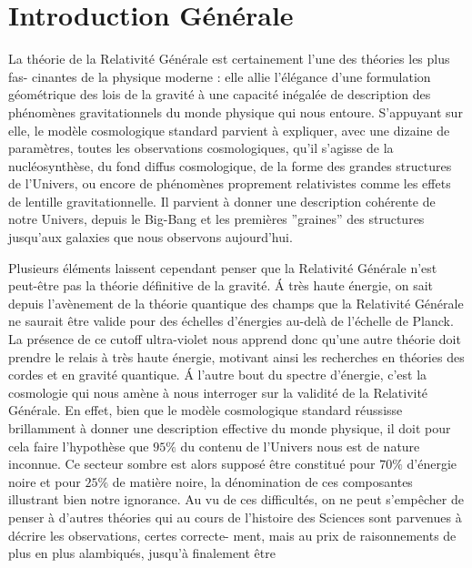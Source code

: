 \documentclass[a4paper,12pt]{report}
\theoremstyle{plain}
\theoremstyle{plain}
\begin{document}
\chapter{Introduction G\'en\'erale} \label{introduction}
 \minitoc 
La th\'eorie de la Relativit\'e G\'en\'erale est certainement l'une des th\'eories les plus fas-
cinantes de la physique moderne : elle allie l'\'el\'egance d'une formulation g\'eom\'etrique des
lois de la gravit\'e \`a une capacit\'e in\'egal\'ee de description des ph\'enom\`enes gravitationnels du
monde physique qui nous entoure. S'appuyant sur elle, le mod\`ele cosmologique standard
parvient \`a expliquer, avec une dizaine de param\`etres, toutes les observations cosmologiques,
qu'il s'agisse de la nucl\'eosynth\`ese, du fond diffus cosmologique, de la forme des grandes
structures de l'Univers, ou encore de ph\'enom\`enes proprement relativistes comme les effets
de lentille gravitationnelle. Il parvient \`a donner une description coh\'erente de notre Univers,
depuis le Big-Bang et les premi\`eres ''graines'' des structures jusqu'aux galaxies que nous
observons aujourd'hui.\par
Plusieurs \'el\'ements laissent cependant penser que la Relativit\'e G\'en\'erale n'est peut-\^etre
pas la th\'eorie d\'efinitive de la gravit\'e. \'A tr\`es haute \'energie, on sait depuis l'av\`enement de
la th\'eorie quantique des champs que la Relativit\'e G\'en\'erale ne saurait \^etre valide pour des
\'echelles d'\'energies au-del\`a de l'\'echelle de Planck. La pr\'esence de ce cutoff ultra-violet nous
apprend donc qu'une autre th\'eorie doit prendre le relais \`a tr\`es haute \'energie, motivant
ainsi les recherches en th\'eories des cordes et en gravit\'e quantique. \'A l'autre bout du
spectre d'\'energie, c'est la cosmologie qui nous am\`ene \`a nous interroger sur la validit\'e
de la Relativit\'e G\'en\'erale. En effet, bien que le mod\`ele cosmologique standard r\'eussisse
brillamment \`a donner une description effective du monde physique, il doit pour cela faire
l'hypoth\`ese que $95\%$ du contenu de l'Univers nous est de nature inconnue. Ce secteur
sombre est alors suppos\'e \^etre constitu\'e pour  $70\%$ d'\'energie noire et pour  $25\%$ de mati\`ere
noire, la d\'enomination de ces composantes illustrant bien notre ignorance.
Au vu de ces difficult\'es, on ne peut s'emp\^echer de penser \`a d'autres th\'eories qui au
cours de l'histoire des Sciences sont parvenues \`a d\'ecrire les observations, certes correcte-
ment, mais au prix de raisonnements de plus en plus alambiqu\'es, jusqu'\`a finalement \^etre
\end{document}

